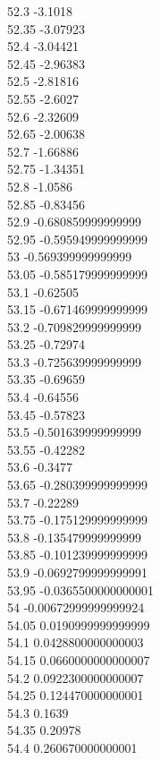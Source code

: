 {52.3	-3.1018\\
52.35	-3.07923\\
52.4	-3.04421\\
52.45	-2.96383\\
52.5	-2.81816\\
52.55	-2.6027\\
52.6	-2.32609\\
52.65	-2.00638\\
52.7	-1.66886\\
52.75	-1.34351\\
52.8	-1.0586\\
52.85	-0.83456\\
52.9	-0.680859999999999\\
52.95	-0.595949999999999\\
53	-0.569399999999999\\
53.05	-0.585179999999999\\
53.1	-0.62505\\
53.15	-0.671469999999999\\
53.2	-0.709829999999999\\
53.25	-0.72974\\
53.3	-0.725639999999999\\
53.35	-0.69659\\
53.4	-0.64556\\
53.45	-0.57823\\
53.5	-0.501639999999999\\
53.55	-0.42282\\
53.6	-0.3477\\
53.65	-0.280399999999999\\
53.7	-0.22289\\
53.75	-0.175129999999999\\
53.8	-0.135479999999999\\
53.85	-0.101239999999999\\
53.9	-0.0692799999999991\\
53.95	-0.0365500000000001\\
54	-0.00672999999999924\\
54.05	0.0190999999999999\\
54.1	0.0428800000000003\\
54.15	0.0660000000000007\\
54.2	0.0922300000000007\\
54.25	0.124470000000001\\
54.3	0.1639\\
54.35	0.20978\\
54.4	0.260670000000001\\
}
